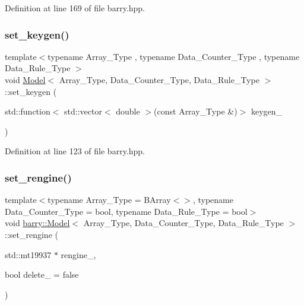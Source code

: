 Definition at line 169 of file barry.\+hpp.

\mbox{\label{classbarry_1_1_model_add1847cdaf3f5bbde6c14efc2e4d16df}} 
\subsubsection{\texorpdfstring{set\+\_\+keygen()}{set\_keygen()}}
{\footnotesize\ttfamily template$<$typename Array\+\_\+\+Type , typename Data\+\_\+\+Counter\+\_\+\+Type , typename Data\+\_\+\+Rule\+\_\+\+Type $>$ \\
void \hyperlink{classbarry_1_1_model}{Model}$<$ Array\+\_\+\+Type, Data\+\_\+\+Counter\+\_\+\+Type, Data\+\_\+\+Rule\+\_\+\+Type $>$\+::set\+\_\+keygen (\begin{DoxyParamCaption}\item[{std\+::function$<$ std\+::vector$<$ double $>$(const Array\+\_\+\+Type \&)$>$}]{keygen\+\_\+ }\end{DoxyParamCaption})\hspace{0.3cm}{\ttfamily [inline]}}



Definition at line 123 of file barry.\+hpp.

\mbox{\label{classbarry_1_1_model_a1e1cdb67d12968394dbd68dad0cff208}} 
\subsubsection{\texorpdfstring{set\+\_\+rengine()}{set\_rengine()}}
{\footnotesize\ttfamily template$<$typename Array\+\_\+\+Type  = B\+Array$<$$>$, typename Data\+\_\+\+Counter\+\_\+\+Type  = bool, typename Data\+\_\+\+Rule\+\_\+\+Type  = bool$>$ \\
void \hyperlink{classbarry_1_1_model}{barry\+::\+Model}$<$ Array\+\_\+\+Type, Data\+\_\+\+Counter\+\_\+\+Type, Data\+\_\+\+Rule\+\_\+\+Type $>$\+::set\+\_\+rengine (\begin{DoxyParamCaption}\item[{std\+::mt19937 $\ast$}]{rengine\+\_\+,  }\item[{bool}]{delete\+\_\+ = {\ttfamily false} }\end{DoxyParamCaption})\hspace{0.3cm}{\ttfamily [inline]}}



